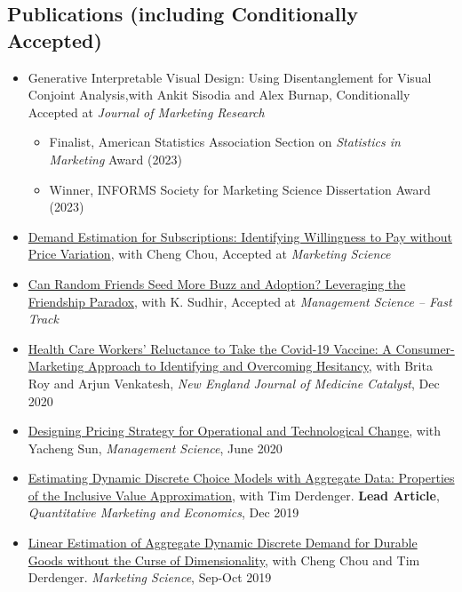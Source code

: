 \documentclass[margin, line, centered, 10pt]{res}
\begin{document}
\begin{resume}
\section{\sc Publications (including Conditionally Accepted)}%
\begin{itemize}
\item Generative Interpretable Visual Design: Using Disentanglement for Visual Conjoint Analysis,with Ankit Sisodia and Alex Burnap, Conditionally Accepted at \textit{Journal of Marketing Research}
\begin{itemize}
\item Finalist, American Statistics Association Section on \textit{Statistics in Marketing} Award (2023)
\item Winner, INFORMS Society for Marketing Science Dissertation Award (2023)
\end{itemize}
\item  \href{http://vineetkumars.github.io/Papers/WTP_Identification.pdf}{Demand Estimation for Subscriptions: Identifying Willingness to Pay without Price Variation}, with Cheng Chou, Accepted at \textit{Marketing Science} %
\item  \href{http://vineetkumars.github.io/Papers/BuzzFriends.pdf}{Can Random Friends Seed More Buzz and Adoption? Leveraging the Friendship Paradox}, with K. Sudhir, Accepted at \textit{Management Science -- Fast Track}
\item  \href{http://vineetkumars.github.io/Papers/VaccineHesitancy.pdf}{
Health Care Workers' Reluctance to Take the Covid-19 Vaccine: A Consumer-Marketing Approach to Identifying and Overcoming Hesitancy}, with Brita Roy and Arjun Venkatesh,   \textit{New England Journal of Medicine Catalyst}, Dec 2020
\item  \href{http://vineetkumars.github.io/Papers/DesigningPricingforTransformation.pdf}{
Designing Pricing Strategy for Operational and Technological Change}, with Yacheng Sun,   \textit{Management Science}, June 2020
\item \href{http://vineetkumars.github.io/Papers/DynamicDiscreteIVSProperties.pdf}{Estimating Dynamic Discrete Choice Models with Aggregate Data: Properties of the Inclusive Value Approximation}, with Tim Derdenger.  \textbf{Lead Article},   \textit{Quantitative Marketing and Economics}, Dec 2019
\item  \href{http://vineetkumars.github.io/Papers/CDKEstimator.pdf}{Linear Estimation of Aggregate Dynamic Discrete Demand for Durable Goods without the Curse of Dimensionality}, with Cheng Chou and Tim Derdenger. \textit{Marketing Science}, Sep-Oct 2019

\end{itemize}
\end{resume}
\end{document}
